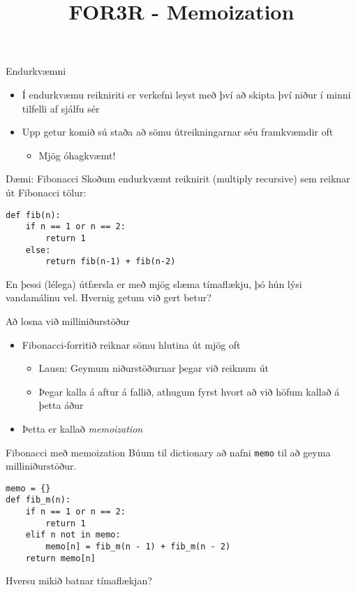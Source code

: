 \documentclass[handout]{beamer}
\title{FOR3R - Memoization}
\begin{document}
\begin{frame}
\titlepage
\end{frame}

\begin{frame}{Endurkvæmni}
\begin{itemize}
 \item Í endurkvæmu reikniriti er verkefni leyst með því að skipta því niður í minni tilfelli af sjálfu sér
 \item Upp getur komið sú staða að sömu útreikningarnar séu framkvæmdir oft
 \begin{itemize}
  \item Mjög óhagkvæmt!
 \end{itemize}
\end{itemize}
\end{frame}

\begin{frame}[fragile]{Dæmi: Fibonacci}
Skoðum endurkvæmt reiknirit (multiply recursive) sem reiknar út Fibonacci tölur:
\begin{verbatim}
def fib(n):
    if n == 1 or n == 2:
        return 1
    else:
        return fib(n-1) + fib(n-2)
\end{verbatim}
En þessi (lélega) útfærsla er með mjög slæma tímaflækju, þó hún lýsi vandamálinu vel. Hvernig getum við gert betur?
\end{frame}

\begin{frame}{Að losna við milliniðurstöður}
\begin{itemize}
 \item Fibonacci-forritið reiknar sömu hlutina út mjög oft
 \begin{itemize}
  \item Lausn: Geymum niðurstöðurnar þegar við reiknum út
  \item Þegar kalla á aftur á fallið, athugum fyrst hvort að við höfum kallað á þetta áður
 \end{itemize}
 \item Þetta er kallað \emph{memoization}
\end{itemize}
\end{frame}

\begin{frame}[fragile]{Fibonacci með memoization}
Búum til dictionary að nafni \texttt{memo} til að geyma milliniðurstöður.
\begin{verbatim}
memo = {}
def fib_m(n):
    if n == 1 or n == 2:
        return 1
    elif n not in memo:
        memo[n] = fib_m(n - 1) + fib_m(n - 2)
    return memo[n]
\end{verbatim}
Hversu mikið batnar tímaflækjan?
\end{frame}
\end{document}

